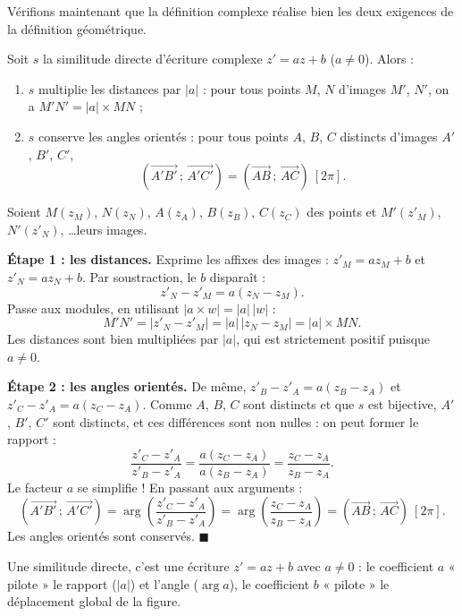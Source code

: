 \documentclass[11pt]{article}
\begin{document}
Vérifions maintenant que la définition complexe réalise bien les deux exigences de la définition géométrique.

\begin{propriete}
Soit $s$ la similitude directe d'écriture complexe $z' = az + b$ ($a \neq 0$). Alors :
\begin{enumerate}
\item $s$ multiplie les distances par $|a|$ : pour tous points $M$, $N$ d'images $M'$, $N'$, on a $M'N' = |a| \times MN$ ;
\item $s$ conserve les angles orientés : pour tous points $A$, $B$, $C$ distincts d'images $A'$, $B'$, $C'$,
\[ \left(\overrightarrow{A'B'}\,;\,\overrightarrow{A'C'}\right) = \left(\overrightarrow{AB}\,;\,\overrightarrow{AC}\right) \ [2\pi]. \]
\end{enumerate}
\end{propriete}

\begin{experience}
Soient $M(z_M)$, $N(z_N)$, $A(z_A)$, $B(z_B)$, $C(z_C)$ des points et $M'(z'_M)$, $N'(z'_N)$, \dots leurs images.

\textbf{Étape 1 : les distances.} Exprime les affixes des images : $z'_M = a z_M + b$ et $z'_N = a z_N + b$. Par soustraction, le $b$ disparaît :
\[ z'_N - z'_M = a(z_N - z_M). \]
Passe aux modules, en utilisant $|a \times w| = |a|\,|w|$ :
\[ M'N' = |z'_N - z'_M| = |a|\,|z_N - z_M| = |a| \times MN. \]
Les distances sont bien multipliées par $|a|$, qui est strictement positif puisque $a \neq 0$.

\textbf{Étape 2 : les angles orientés.} De même, $z'_{B} - z'_{A} = a(z_B - z_A)$ et $z'_{C} - z'_{A} = a(z_C - z_A)$. Comme $A$, $B$, $C$ sont distincts et que $s$ est bijective, $A'$, $B'$, $C'$ sont distincts, et ces différences sont non nulles : on peut former le rapport :
\[ \frac{z'_{C} - z'_{A}}{z'_{B} - z'_{A}} = \frac{a(z_C - z_A)}{a(z_B - z_A)} = \frac{z_C - z_A}{z_B - z_A}. \]
Le facteur $a$ se simplifie ! En passant aux arguments :
\[ \left(\overrightarrow{A'B'}\,;\,\overrightarrow{A'C'}\right) = \arg\left(\frac{z'_{C} - z'_{A}}{z'_{B} - z'_{A}}\right) = \arg\left(\frac{z_C - z_A}{z_B - z_A}\right) = \left(\overrightarrow{AB}\,;\,\overrightarrow{AC}\right) \ [2\pi]. \]
Les angles orientés sont conservés. \hfill$\blacksquare$
\end{experience}

\begin{aretenir}
Une similitude directe, c'est une écriture $z' = az + b$ avec $a \neq 0$ : le coefficient $a$ « pilote » le rapport ($|a|$) et l'angle ($\arg a$), le coefficient $b$ « pilote » le déplacement global de la figure.
\end{aretenir}
\end{document}
